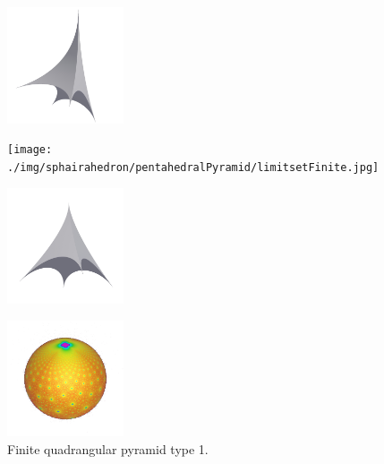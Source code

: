 \documentclass[suppldata, dvipdfmx]{interact}
\theoremstyle{plain}%
\theoremstyle{definition}
\theoremstyle{remark}
\theoremstyle{problemstyle}
\begin{document}
\begin{figure}[h!tbp]
 \begin{minipage}{0.5\textwidth}
  \begin{minipage}[t]{0.24\textwidth}
   \centering
   \includegraphics[width=1.35in, height=1.35in, keepaspectratio]{./img/sphairahedron/pentahedralPyramid/sphairahedronFinite.jpg}
   \label{fig:pentahedralPyramidSphairahedronFinite1}
  \end{minipage}
  \hspace*{\fill}
  \begin{minipage}[t]{0.24\textwidth}
   \centering
   \texttt{[image: ./img/sphairahedron/pentahedralPyramid/limitsetFinite.jpg]}
   \label{fig:pentahedralPyramidLimitsetFinite1}
  \end{minipage}
  \hspace*{\fill}
  \caption{Finite quadrangular pyramid type 1.}
  \label{fig:pentahedralPyramidFinite}
 \end{minipage}
 \hspace*{\fill}
 \begin{minipage}{0.5\textwidth}
\begin{minipage}[t]{0.24\textwidth}
   \centering
   \includegraphics[width=1.35in, height=1.35in, keepaspectratio]{./img/sphairahedron/pentahedralPyramid/sphairahedronFiniteType1.jpg}
 \label{fig:pentahedralPyramidSphairahedronFinite2}
  \end{minipage}
  \hspace*{\fill}
  \begin{minipage}[t]{0.24\textwidth}
   \centering
   \includegraphics[width=1.35in, height=1.35in, keepaspectratio]{./img/sphairahedron/pentahedralPyramid/limitsetFiniteType1.jpg}

\end{minipage}
\end{minipage}
\end{figure}
\end{document}
